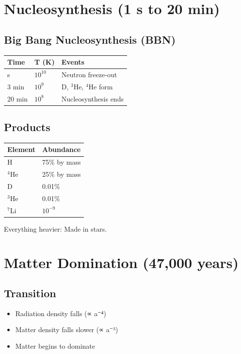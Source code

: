 \documentclass[
  11pt,
  letterpaper,
  twoside,
  openright]{book}
\providecommand{\tightlist}{%
  \setlength{\itemsep}{0pt}\setlength{\parskip}{0pt}}
\begin{document}
\section{Nucleosynthesis (1 s to 20
min)}\label{nucleosynthesis-1-s-to-20-min}

\subsection{Big Bang Nucleosynthesis
(BBN)}\label{big-bang-nucleosynthesis-bbn}

\begin{longtable}[]{@{}lll@{}}
\toprule\noalign{}
Time & T (K) & Events \\
\midrule\noalign{}
\endhead
\bottomrule\noalign{}
\endlastfoot
1 s & \(10^{10}\) & Neutron freeze-out \\
3 min & \(10^{9}\) & D, \(^3\)He, \(^4\)He form \\
20 min & \(10^{8}\) & Nucleosynthesis ends \\
\end{longtable}

\subsection{Products}\label{products}

\begin{longtable}[]{@{}ll@{}}
\toprule\noalign{}
Element & Abundance \\
\midrule\noalign{}
\endhead
\bottomrule\noalign{}
\endlastfoot
H & 75\% by mass \\
\(^4\)He & 25\% by mass \\
D & 0.01\% \\
\(^3\)He & 0.01\% \\
\(^7\)Li & \(10^{-9}\) \\
\end{longtable}

Everything heavier: Made in stars.

\section{Matter Domination (47,000
years)}\label{matter-domination-47000-years}

\subsection{Transition}\label{transition-31}

\begin{itemize}
\tightlist
\item
  Radiation density falls (∝ a⁻⁴)
\item
  Matter density falls slower (∝ a⁻³)
\item
  Matter begins to dominate
\end{itemize}
\end{document}
